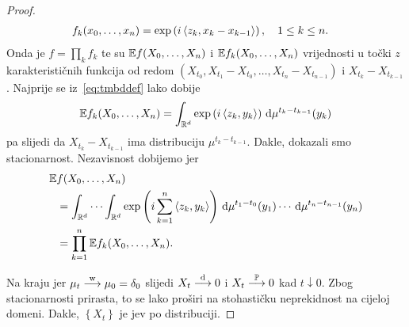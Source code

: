 \documentclass[main.tex]{subfiles}
\begin{document}
\begin{proof}
\begin{equation}
\begin{aligned}
			 & f_k(x_0, \ldots, x_n) = \exp \left( i \left\langle {z_k}, {x_k-x_{k-1}} \right\rangle \right), \quad 1 \le k \le n.
		\end{aligned}
	\end{equation}
	Onda je \( f = \prod_k f_k \) te su \( \mathbb{E} f(X_0, \ldots, X_n) \) i \( \mathbb{E} f_k(X_0, \ldots, X_n) \)
	vrijednosti u točki \( z \) karakterističnih funkcija od redom \( (X_{t_0}, X_{t_1}-X_{t_0},\ldots, X_{t_n}-X_{t_{n-1}}) \) i \( X_{t_k}-X_{t_{k-1}} \). Najprije se iz~\eqref{eq:tmbddef} lako dobije
	\begin{equation}
		\mathbb{E} f_k(X_0, \ldots, X_n) = \int_{\mathbb{R}^d} \exp\left(i\left\langle {z_k}, {y_k} \right\rangle\right) \,\mathrm d \mu^{t_k-t_{k-1}} (y_k)
	\end{equation}
	pa slijedi da \( X_{t_k}-X_{t_{k-1}} \) ima distribuciju \( \mu^{t_k-t_{k-1}} \). Dakle, dokazali smo stacionarnost. Nezavisnost dobijemo jer
	\begin{equation}
		\begin{aligned}
			\mathbb{E} & f(X_0, \ldots, X_n)                                                                \\
			   & = \int_{\mathbb{R}^d} \cdots \int_{\mathbb{R}^d} \exp \left( i \sum_{k=1}^n \left\langle {z_k}, {y_k} \right\rangle \right)
			\,\mathrm d \mu^{t_1-t_0}(y_1) \cdots \,\mathrm d \mu^{t_n-t_{n-1}} (y_n)                                 \\
			   & = \prod_{k=1}^n \mathbb{E} f_k(X_0, \ldots, X_n).
		\end{aligned}
	\end{equation}

	Na kraju jer \( \mu_t \stackrel{\mathrm w}{\longrightarrow} \mu_0 = \delta_0  \) slijedi \( X_t \stackrel{\mathrm d}{\longrightarrow} 0 \) i \( X_t \stackrel{\mathbb P}{\longrightarrow} 0 \) kad \( t \downarrow 0 \). Zbog stacionarnosti prirasta, to se lako proširi na stohastičku neprekidnost na cijeloj domeni. Dakle, \( \left\{ X_t \right\} \) je \levy jev po distribuciji.
\end{proof}
\end{document}

